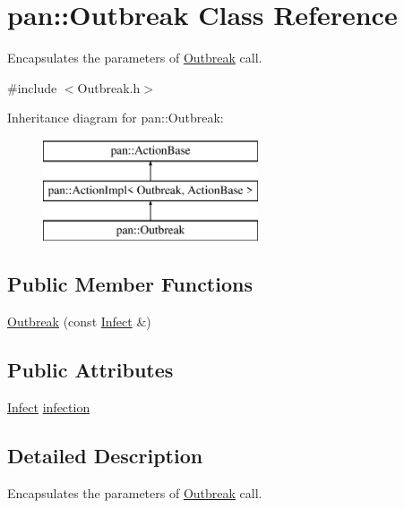 \hypertarget{classpan_1_1_outbreak}{}\section{pan\+:\+:Outbreak Class Reference}
\label{classpan_1_1_outbreak}


Encapsulates the parameters of \hyperlink{classpan_1_1_outbreak}{Outbreak} call.  




{\ttfamily \#include $<$Outbreak.\+h$>$}

Inheritance diagram for pan\+:\+:Outbreak\+:\begin{figure}[H]
\begin{center}
\leavevmode
\includegraphics[height=3.000000cm]{classpan_1_1_outbreak}
\end{center}
\end{figure}
\subsection*{Public Member Functions}
\begin{DoxyCompactItemize}
\item 
\hyperlink{classpan_1_1_outbreak_aade590b33f30c7f43f5bb1707234538e}{Outbreak} (const \hyperlink{classpan_1_1_infect}{Infect} \&)
\end{DoxyCompactItemize}
\subsection*{Public Attributes}
\begin{DoxyCompactItemize}
\item 
\hyperlink{classpan_1_1_infect}{Infect} \hyperlink{classpan_1_1_outbreak_a5022e716ec1b51ad1ed9e19a566afdb3}{infection}
\end{DoxyCompactItemize}


\subsection{Detailed Description}
Encapsulates the parameters of \hyperlink{classpan_1_1_outbreak}{Outbreak} call. 

